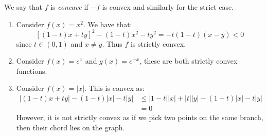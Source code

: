 \documentclass[../main.tex]{subfiles}
\begin{document}
\begin{remark}
  We say that $f$ is \textit{concave} if $-f$ is convex and similarly for the strict case.
\end{remark}
\begin{example}
  \begin{enumerate}
    \item Consider $f(x) = x^2$.
      We have that:
      \[
        [(1 - t)x + ty]^2 - (1 - t)x^2 - ty^2 = - t(1 - t)(x - y) < 0
      \]
      since $t \in (0, 1)$ and $x \neq y$.
      Thus $f$ is strictly convex.
    \item Consider $f(x) = e^{x}$ and $g(x) = e^{-x}$, these are both strictly convex functions.
    \item Consider $f(x) = |x|$.
      This is convex as:
      \begin{align*}
        |(1 - t)x + ty| - (1 - t)|x| - t|y| &\leq |1 - t||x| + |t||y| - (1 - t)|x| - t|y| \\
                                            &= 0
      \end{align*}
      However, it is not strictly convex as if we pick two points on the same branch, then their chord lies on the graph.
  \end{enumerate}
\end{example}
\end{document}
